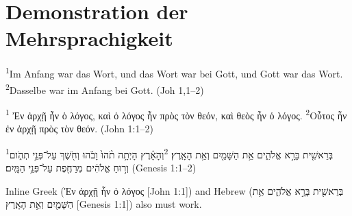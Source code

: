 \section{Demonstration der Mehrsprachigkeit}
\textsuperscript{1}Im Anfang war das Wort, und das Wort war bei Gott, und Gott war das Wort. \textsuperscript{2}Dasselbe war im Anfang bei Gott.
(Joh 1,1–2)


\textsuperscript{1} Ἐν ἀρχῇ ἦν ὁ λόγος, καὶ ὁ λόγος ἦν πρὸς τὸν θεόν, καὶ θεὸς ἦν ὁ λόγος. \textsuperscript{2}Οὗτος ἦν ἐν ἀρχῇ πρὸς τὸν θεόν.
\foreignlanguage{british}{(John 1:1–2)}


\textsuperscript{1}בְּרֵאשִׁ֖ית בָּרָ֣א אֱלֹהִ֑ים אֵ֥ת הַשָּׁמַ֖יִם וְאֵ֥ת הָאָֽרֶץ׃
\textsuperscript{2}וְהָאָ֗רֶץ הָיְתָ֥ה תֹ֨הוּ֙ וָבֹ֔הוּ וְחֹ֖שֶׁךְ עַל־פְּנֵ֣י תְהֹ֑ום וְר֣וּחַ אֱלֹהִ֔ים מְרַחֶ֖פֶת
עַל־פְּנֵ֥י הַמָּֽיִם׃ \foreignlanguage{british}{(Genesis 1:1–2)}


Inline Greek (\foreignlanguage{polutonikogreek}{Ἐν ἀρχῇ ἦν ὁ λόγος} [John 1:1]) and Hebrew (\foreignlanguage{hebrew}{בְּרֵאשִׁ֖ית בָּרָ֣א אֱלֹהִ֑ים אֵ֥ת הַשָּׁמַ֖יִם וְאֵ֥ת הָאָֽרֶץ} [Genesis
1:1]) also must work.